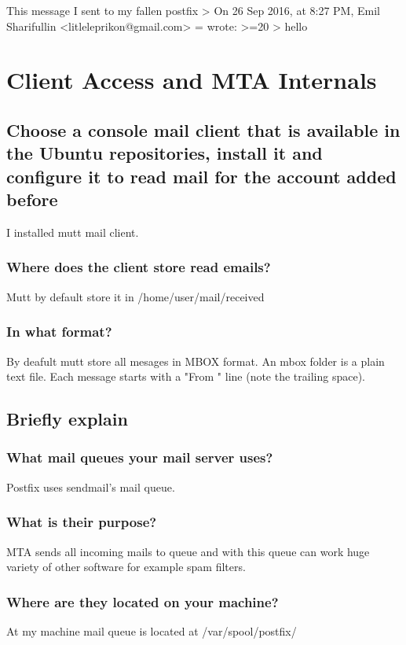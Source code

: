 \documentclass[a4paper,11pt]{article}
\begin{document}
\begin{bashcode}
This message I sent to my fallen postfix
> On 26 Sep 2016, at 8:27 PM, Emil Sharifullin <litleleprikon@gmail.com> =
wrote:
>=20
> hello



\end{bashcode}

\section{Client Access and MTA Internals}
\addtocounter{subsection}{6}
\subsection{Choose a console mail client that is available in the Ubuntu repositories, install it and configure it to read mail for the account added before}
I installed mutt mail client.
\subsubsection{Where does the client store read emails?}
Mutt by default store it in /home/user/mail/received

\subsubsection{In what format?}
By deafult mutt store all mesages in MBOX format. An mbox folder is a plain text file. Each message starts with a "From " line (note the trailing space).

\subsection{Briefly explain}
\subsubsection{What mail queues your mail server uses?}
Postfix uses sendmail's mail queue.
\subsubsection{What is their purpose?}
MTA sends all incoming mails to queue and with this queue can work huge variety of other software for example spam filters.
\subsubsection{Where are they located on your machine?}
At my machine mail queue is located at /var/spool/postfix/
\end{document}
